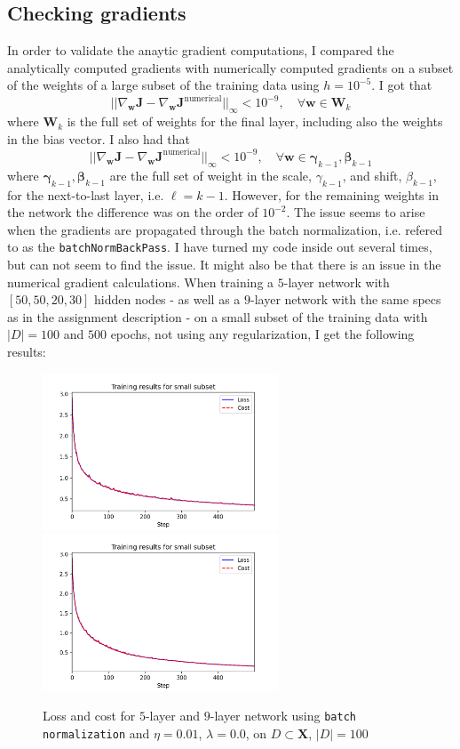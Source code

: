 \documentclass{article}
\begin{document}
\newpage

\subsection*{Checking gradients}

	In order to validate the anaytic gradient computations, I compared the analytically computed gradients with numerically computed gradients on a subset of the weights of a large subset of the training data using $h = 10^{-5}$.  I got that
	$$\vert\vert \nabla_{\bm{w}} \bm{J}- \nabla_{\bm{w}} \bm{J}^{\text{numerical}} \vert\vert_{\infty} < 10^{-9}, \quad \forall\bm{w} \in \bm{W}_k$$
	where $\bm{W}_k$ is the full set of weights for the final layer, including also the weights in the bias vector. I also had that
	$$\vert\vert \nabla_{\bm{w}} \bm{J} - \nabla_{\bm{w}} \bm{J}^{\text{numerical}} \vert\vert_{\infty} < 10^{-9}, \quad \forall\bm{w} \in \bm{\gamma}_{k-1}, \bm{\beta}_{k-1}$$
	where $\bm{\gamma}_{k-1}, \bm{\beta}_{k-1}$ are the full set of weight in the scale, $\gamma_{k-1}$, and shift, $\beta_{k-1}$, for the next-to-last layer, i.e. $\ell = k-1$. However, for the remaining weights in the network the difference was on the order of $10^{-2}$. The issue seems to arise when the gradients are propagated through the batch normalization, i.e. refered to as the \texttt{batchNormBackPass}. I have turned my code inside out several times, but can not seem to find the issue. It might also be that there is an issue in the numerical gradient calculations. When training a $5$-layer network with $[50, 50, 20, 30]$ hidden nodes - as well as a $9$-layer network with the same specs as in the assignment description - on a small subset of the training data with $\vert D\vert = 100$ and $500$ epochs, not using any regularization, I get the following results:
	\begin{figure}[h!]
		\centering
		\includegraphics[width=7cm]{../plots/grad_test_5layer.png}
		\includegraphics[width=7cm]{../plots/grad_test_9layer.png}
		\caption{Loss and cost for $5$-layer and $9$-layer network using \texttt{batch normalization} and $\eta=0.01$, $\lambda=0.0$, on $D\subset \bm{X}$, $\vert D\vert = 100$}
	\end{figure}\\
\end{document}
